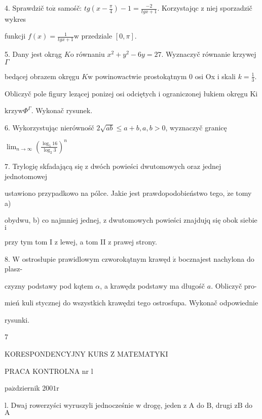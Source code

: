 \documentclass[a4paper,12pt]{article}
\begin{document}
4. Sprawdzič $\mathrm{t}\mathrm{o}\dot{\mathrm{z}}$ samośč: $tg(x-\displaystyle \frac{\pi}{4})-1=\frac{-2}{tgx+1}$. Korzystajqc $\mathrm{z}$ niej sporzadzič wykres

funkcji $f(x)=\displaystyle \frac{1}{tgx+1}\mathrm{w}$ przedziale $[0,\pi].$

5. Dany jest okrąg $K\mathrm{o}$ równaniu $x^{2}+y^{2}-6y=27$. Wyznaczyč równanie krzywej $\Gamma$

bedącej obrazem okręgu $K\mathrm{w}$ powinowactwie prostokątnym $0$ osi Ox $\mathrm{i}$ skali $k=\displaystyle \frac{1}{3}.$

Obliczyč pole figury lezącej ponizej osi odciętych $\mathrm{i}$ ograniczonej łukiem okręgu $\mathrm{K}\mathrm{i}$

$\mathrm{k}\mathrm{r}\mathrm{z}\mathrm{y}\mathrm{w}\Phi^{\Gamma}$. Wykonač rysunek.

6. Wykorzystując nierównośč $2\sqrt{ab}\leq a+b, a, b>0$, wyznaczyč granicę

$\displaystyle \lim_{n\rightarrow\infty}(\frac{\log_{5}16}{\log_{2}3})^{n}$

7. Trylogię skfadającą się $\mathrm{z}$ dwóch powieści dwutomowych oraz jednej jednotomowej

ustawiono przypadkowo na pólce. Jakie jest prawdopodobieństwo tego, $\dot{\mathrm{z}}\mathrm{e}$ tomy a)

obydwu, b) co najmniej jednej, $\mathrm{z}$ dwutomowych powieści znajdujq się obok siebie $\mathrm{i}$

przy tym tom I $\mathrm{z}$ lewej, a tom II $\mathrm{z}$ prawej strony.

8. $\mathrm{W}$ ostrosłupie prawidlowym czworokątnym krawęd $\acute{\mathrm{z}}$ bocznajest nachylona do plasz-

czyzny podstawy pod kqtem $\alpha$, a krawędz$\acute{}$ podstawy ma długośč $a$. Obliczyč pro-

mień kuli stycznej do wszystkich krawędzi tego ostrosfupa. Wykonač odpowiednie

rysunki.

7







KORESPONDENCYJNY KURS Z MATEMATYKI

PRACA KONTROLNA nr l

$\mathrm{p}\mathrm{a}\acute{\mathrm{z}}$dziernik 2$001\mathrm{r}$

l. Dwaj rowerzyści wyruszyli jednocześnie $\mathrm{w}$ drogę, jeden $\mathrm{z}$ A do $\mathrm{B}$, drugi $\mathrm{z}\mathrm{B}$ do $\mathrm{A}$
\end{document}
